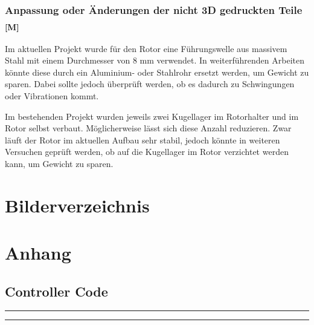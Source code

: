 \documentclass[a4paper,12pt]{article}
\begin{document}
\subsubsection{\texorpdfstring{Anpassung oder Änderungen der nicht 3D gedruckten Teile \textsubscript{[M]}}{Anpassung oder Änderungen der nicht 3D gedruckten Teile [M]}}

Im aktuellen Projekt wurde für den Rotor eine Führungswelle aus massivem Stahl mit einem Durchmesser von 8 mm verwendet. In weiterführenden Arbeiten könnte diese durch ein Aluminium- oder Stahlrohr ersetzt werden, um Gewicht zu sparen. Dabei sollte jedoch überprüft werden, ob es dadurch zu Schwingungen oder Vibrationen kommt.\newline

Im bestehenden Projekt wurden jeweils zwei Kugellager im Rotorhalter und im Rotor selbst verbaut. Möglicherweise lässt sich diese Anzahl reduzieren. Zwar läuft der Rotor im aktuellen Aufbau sehr stabil, jedoch könnte in weiteren Versuchen geprüft werden, ob auf die Kugellager im Rotor verzichtet werden kann, um Gewicht zu sparen.

\newpage


\appendix



\newpage



\medskip


\newpage
\section{Bilderverzeichnis}
\listoffigures

\newpage


\newpage
\section{Anhang}

\subsection{Controller Code}

\noindent\rule{\linewidth}{0.4pt}  %

\noindent\rule{\linewidth}{0.4pt}  %
\end{document}
